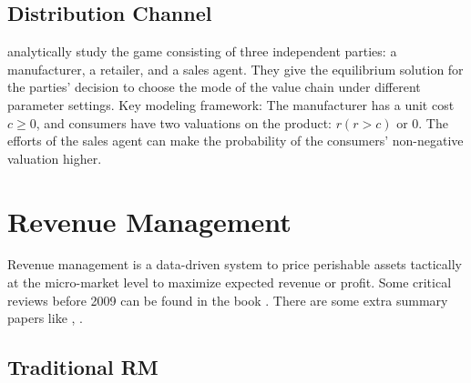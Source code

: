 \documentclass[12pt]{report}
\begin{document}
\subsection{Distribution Channel}

\cite{kouvelis2020should} analytically study the game consisting of three independent parties: a manufacturer, a retailer, and a sales agent. They
give the equilibrium solution for the parties' decision to choose the mode of the value chain under different parameter settings. Key modeling framework:
The manufacturer has a unit cost $c\ge 0$, and consumers have two valuations on the product: $r(r>c)$ or $0$. The efforts of the sales agent can make the probability
of the consumers' non-negative valuation higher.

\clearpage
\section{Revenue Management}

Revenue management is a data-driven system to price perishable assets tactically
at the micro-market level to maximize expected revenue or profit. Some critical reviews
before 2009 can be found in the book \cite{Gallego2019}.
There are some extra summary papers like \cite{Strauss2018},
\cite{Klein2020}.

\subsection{Traditional RM}

\end{document}
